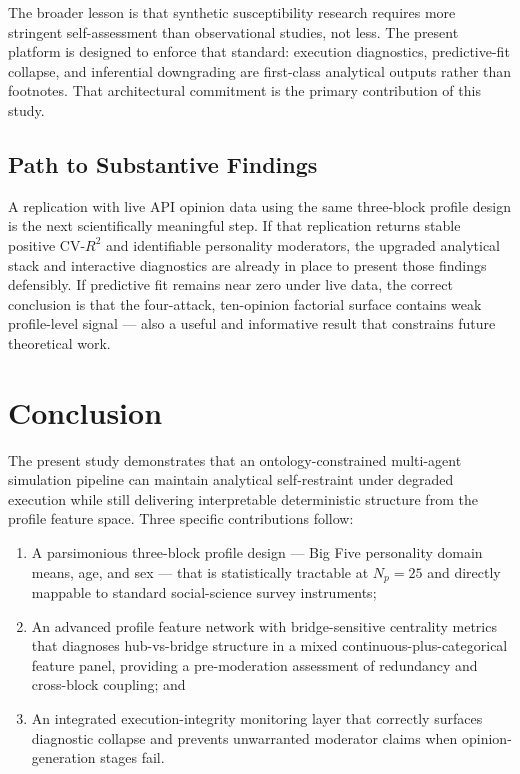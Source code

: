 \documentclass[11pt,a4paper]{article}
\begin{document}
The broader lesson is that synthetic susceptibility research requires more stringent self-assessment than observational studies, not less. The present platform is designed to enforce that standard: execution diagnostics, predictive-fit collapse, and inferential downgrading are first-class analytical outputs rather than footnotes. That architectural commitment is the primary contribution of this study.

\subsection{Path to Substantive Findings}

A replication with live API opinion data using the same three-block profile design is the next scientifically meaningful step. If that replication returns stable positive $\mathrm{CV}\text{-}R^2$ and identifiable personality moderators, the upgraded analytical stack and interactive diagnostics are already in place to present those findings defensibly. If predictive fit remains near zero under live data, the correct conclusion is that the four-attack, ten-opinion factorial surface contains weak profile-level signal — also a useful and informative result that constrains future theoretical work.

\section{Conclusion}

The present study demonstrates that an ontology-constrained multi-agent simulation pipeline can maintain analytical self-restraint under degraded execution while still delivering interpretable deterministic structure from the profile feature space. Three specific contributions follow:
\begin{enumerate}
  \item A parsimonious three-block profile design — Big Five personality domain means, age, and sex — that is statistically tractable at $N_p = 25$ and directly mappable to standard social-science survey instruments;
  \item An advanced profile feature network with bridge-sensitive centrality metrics that diagnoses hub-vs-bridge structure in a mixed continuous-plus-categorical feature panel, providing a pre-moderation assessment of redundancy and cross-block coupling; and
  \item An integrated execution-integrity monitoring layer that correctly surfaces diagnostic collapse and prevents unwarranted moderator claims when opinion-generation stages fail.
\end{enumerate}
\end{document}

